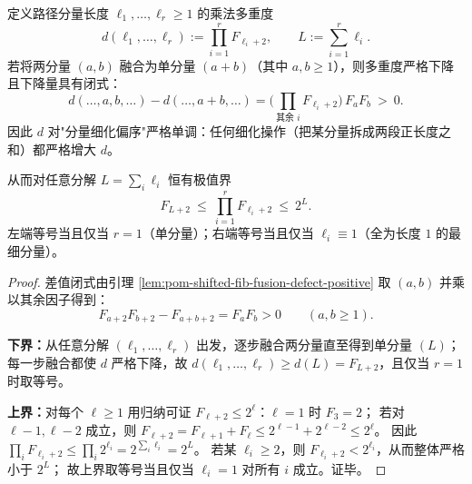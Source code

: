 \begin{proposition}[路径分量乘法多重度的细化单调性与极值界]\label{prop:pom-path-component-multiplicity-refinement-monotone-extrema}
定义路径分量长度 \(\ell_1,\dots,\ell_r\ge 1\) 的乘法多重度
\[
d(\ell_1,\dots,\ell_r):=\prod_{i=1}^r F_{\ell_i+2},
\qquad
L:=\sum_{i=1}^r \ell_i.
\]
若将两分量 \((a,b)\) 融合为单分量 \((a+b)\)（其中 \(a,b\ge 1\)），则多重度严格下降且下降量具有闭式：
\[
\boxed{\;
d(\ldots,a,b,\ldots)-d(\ldots,a+b,\ldots)
=\Big(\prod_{\text{其余 }i}F_{\ell_i+2}\Big)\,F_aF_b\ >\ 0.\;}
\]
因此 \(d\) 对"分量细化偏序"严格单调：任何细化操作（把某分量拆成两段正长度之和）都严格增大 \(d\)。

从而对任意分解 \(L=\sum_i\ell_i\) 恒有极值界
\[
\boxed{\;
F_{L+2}\ \le\ \prod_{i=1}^r F_{\ell_i+2}\ \le\ 2^L.\;}
\]
左端等号当且仅当 \(r=1\)（单分量）；右端等号当且仅当 \(\ell_i\equiv 1\)（全为长度 \(1\) 的最细分量）。
\end{proposition}
\begin{proof}
差值闭式由引理 \ref{lem:pom-shifted-fib-fusion-defect-positive} 取 \((a,b)\) 并乘以其余因子得到：
\[
F_{a+2}F_{b+2}-F_{a+b+2}=F_aF_b>0\qquad(a,b\ge 1).
\]
\par
\textbf{下界：}从任意分解 \((\ell_1,\dots,\ell_r)\) 出发，逐步融合两分量直至得到单分量 \((L)\)；
每一步融合都使 \(d\) 严格下降，故
\(
d(\ell_1,\dots,\ell_r)\ge d(L)=F_{L+2}
\)，且仅当 \(r=1\) 时取等号。
\par
\textbf{上界：}对每个 \(\ell\ge 1\) 用归纳可证 \(F_{\ell+2}\le 2^\ell\)：\(\ell=1\) 时 \(F_3=2\)；
若对 \(\ell-1,\ell-2\) 成立，则
\(
F_{\ell+2}=F_{\ell+1}+F_\ell\le 2^{\ell-1}+2^{\ell-2}\le 2^\ell
\)。
因此
\(
\prod_i F_{\ell_i+2}\le \prod_i 2^{\ell_i}=2^{\sum_i\ell_i}=2^L
\)。
若某 \(\ell_i\ge 2\)，则 \(F_{\ell_i+2}<2^{\ell_i}\)，从而整体严格小于 \(2^L\)；
故上界取等号当且仅当 \(\ell_i=1\) 对所有 \(i\) 成立。证毕。
\end{proof}

